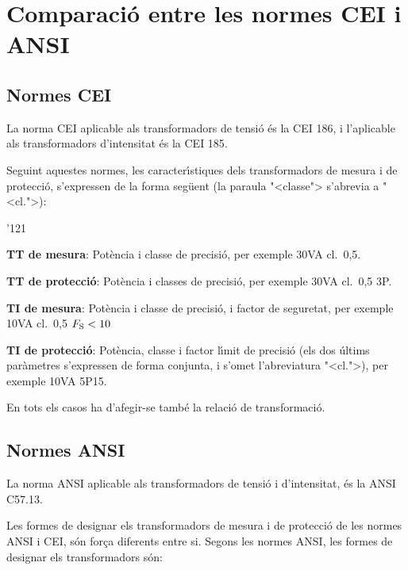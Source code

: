 \section{Comparaci\'{o} entre les normes CEI i
ANSI}\label{sec:comp_tt_ti_cei_ansi}

\subsection{Normes CEI}

La norma \textsf{CEI} aplicable als transformadors de tensi\'{o} \'{e}s la
\textsf{CEI 186}, i l'aplicable als transformadors
d'intensitat \'{e}s la \textsf{CEI 185}.

Seguint aquestes normes, les caracter\'{\i}stiques dels transformadors de
mesura i de protecci\'{o}, s'expressen de la forma seg\"{u}ent (la paraula
{"<}classe{">} s'abrevia a {"<}cl.{">}):
\begin{dinglist}{'121}
   \item \textbf{TT de mesura}: Pot\`{e}ncia i classe de precisi\'{o}, per
   exemple 30\unit{VA} cl.~0,5.
   \item \textbf{TT de protecci\'{o}}: Pot\`{e}ncia i classes de precisi\'{o}, per
   exemple 30\unit{VA} cl.~0,5 3P.
   \item \textbf{TI de mesura}: Pot\`{e}ncia i classe de precisi\'{o}, i factor de seguretat, per
   exemple 10\unit{VA} cl.~0,5 $F_\mathrm{S}<10$
   \item \textbf{TI de protecci\'{o}}: Pot\`{e}ncia, classe i factor l\'{\i}mit de precisi\'{o}
    (els dos \'{u}ltims par\`{a}metres s'expressen de forma conjunta, i s'omet l'abreviatura {"<}cl.{">}),
     per exemple 10\unit{VA} 5P15.
\end{dinglist}

En tots els casos ha d'afegir-se tamb\'{e} la relaci\'{o} de transformaci\'{o}.

\subsection{Normes ANSI}

La norma \textsf{ANSI} aplicable als transformadors de tensi\'{o} i
d'intensitat, \'{e}s la \textsf{ANSI C57.13}.

Les formes de designar els transformadors  de mesura i de protecci\'{o}
de les normes \textsf{ANSI} i \textsf{CEI}, s\'{o}n for\c{c}a diferents
entre si. Segons les normes \textsf{ANSI},  les formes de designar
els transformadors s\'{o}n:

